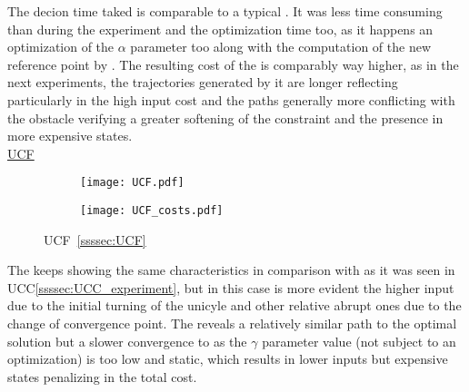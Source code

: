 The  decion time taked is comparable to a typical . It was less time consuming than  during the experiment and the optimization time too, as it happens an optimization of the \(\alpha\) parameter too along with the computation of the new reference point by . The resulting cost of the  is comparably way higher, as in the next experiments, the trajectories generated by it are longer reflecting particularly in the high input cost and the paths generally more conflicting with the obstacle verifying a greater softening of the  constraint and the presence in more expensive states. \\


\underline{UCF}
\label{ssssec:UCF_experiments} %


\begin{figure}[htbp]
  \begin{subfigure}{0.55\textwidth}
    \centering
    \texttt{[image: UCF.pdf]}
  \label{fig:UCF_CostEvol}
  \end{subfigure}
  \begin{subfigure}{0.6\textwidth}
    \centering
    \texttt{[image: UCF\_costs.pdf]}
  \label{fig:UCF_trajectory}
  \end{subfigure}
  \caption{UCF~\ref{ssssec:UCF}}
\label{fig:UCFTrajectory_and_CostEvol}
\end{figure}



The  keeps showing the same characteristics in comparison with  as it was seen in UCC\ref{ssssec:UCC_experiment}, but in this case is more evident the higher input due to the initial turning of the unicyle and other relative abrupt ones due to the change of convergence point. The  reveals a relatively similar path to the optimal solution but a slower convergence to \txtref as the \(\gamma\) parameter value (not subject to an optimization) is too low and static, which results in lower inputs but expensive states penalizing in the total cost. \\ 

\vspace{5em}


